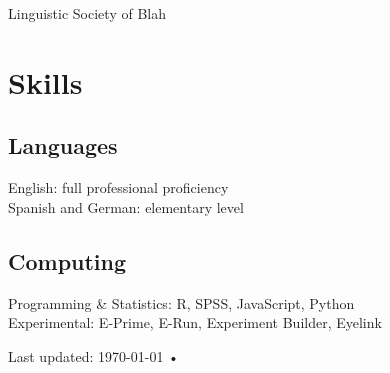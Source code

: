 \documentclass[11.5pt, a4paper]{article}
\newcommand{\years}[1]{\marginnote{\scriptsize #1}}
\begin{document}
\years{2017-}Linguistic Society of Blah \\


\section*{\faWrench \thinspace Skills}

\subsection*{Languages}
English: full professional proficiency \\
Spanish and German: elementary level

\subsection*{Computing}
Programming \& Statistics: R, SPSS, JavaScript, Python \\
Experimental: E-Prime, E-Run, Experiment Builder, Eyelink \\




\vfill{}

\begin{center}
{\scriptsize  Last updated: \today\- •\- }
\end{center}
\end{document}
